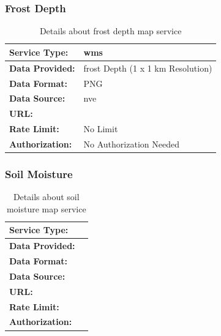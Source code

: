 \subsubsection*{Frost Depth}
\begin{table}[h]
    \centering
    \begin{tabularx}{\linewidth}{|l|X|}
        \hline
        \textbf{Service Type:} & \Gls{wms} \\
        \hline
        \textbf{Data Provided:} & \Gls{frost} Depth (1 x 1 km Resolution) \\
        \hline
        \textbf{Data Format:} & PNG \\
        \hline
        \textbf{Data Source:} & \Gls{nve} \\
        \hline
        \textbf{URL:} & \url{} \\
        \hline
        \textbf{Rate Limit:} & No Limit \\
        \hline
        \textbf{Authorization:} & No Authorization Needed \\
        \hline
    \end{tabularx}
    \caption{Details about frost depth map service}
    \label{tab:frost_map_service}
\end{table}


\subsubsection*{Soil Moisture}
\begin{table}[h]
    \centering
    \begin{tabularx}{\linewidth}{|l|X|}
        \hline
        \textbf{Service Type:} &  \\
        \hline
        \textbf{Data Provided:} &  \\
        \hline
        \textbf{Data Format:} &  \\
        \hline
        \textbf{Data Source:} &  \\
        \hline
        \textbf{URL:} &  \\
        \hline
        \textbf{Rate Limit:} &  \\
        \hline
        \textbf{Authorization:} & \\
        \hline
    \end{tabularx}
    \caption{Details about soil moisture map service}
    \label{tab:soil_moisture_map_service}
\end{table}


